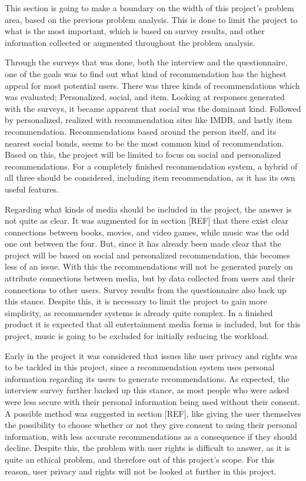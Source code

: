 This section is going to make a boundary on the width of this project’s problem area, based on the previous problem analysis. This is done to limit the project to what is the most important, which is based on survey results, and other information collected or augmented throughout the problem analysis.

Through the surveys that was done, both the interview and the questionnaire, one of the goals was to find out what kind of recommendation has the highest appeal for most potential users. There was three kinds of recommendations which was evaluated; Personalized, social, and item. Looking at responses generated with the surveys, it became apparent that social was the dominant kind. Followed by personalized, realized with recommendation sites like IMDB, and lastly item recommendation. Recommendations based around the person itself, and its nearest social bonds, seems to be the most common kind of recommendation. Based on this, the project will be limited to focus on social and personalized recommendations. For a completely finished recommendation system, a hybrid of all three should be considered, including item recommendation, as it has its own useful features.

Regarding what kinds of media should be included in the project, the answer is not quite as clear. It was augmented for in section [REF] that there exist clear connections between books, movies, and video games, while music was the odd one out between the four. But, since it has already been made clear that the project will be based on social and personalized recommendation, this becomes less of an issue. With this the recommendations will not be generated purely on attribute connections between media, but by data collected from users and their connections to other users. Survey results from the questionnaire also back up this stance. Despite this, it is necessary to limit the project to gain more simplicity, as recommender systems is already quite complex. In a finished product it is expected that all entertainment media forms is included, but for this project, music is going to be excluded for initially reducing the workload.

Early in the project it was considered that issues like user privacy and rights was to be tackled in this project, since a recommendation system uses personal information regarding its users to generate recommendations. As expected, the interview survey further backed up this stance, as most people who were asked were less secure with their personal information being used without their consent. A possible method was suggested in section [REF], like giving the user themselves the possibility to choose whether or not they give consent to using their personal information, with less accurate recommendations as a consequence if they should decline. Despite this, the problem with user rights is difficult to answer, as it is quite an ethical problem, and therefore out of this project’s scope. For this reason, user privacy and rights will not be looked at further in this project.

